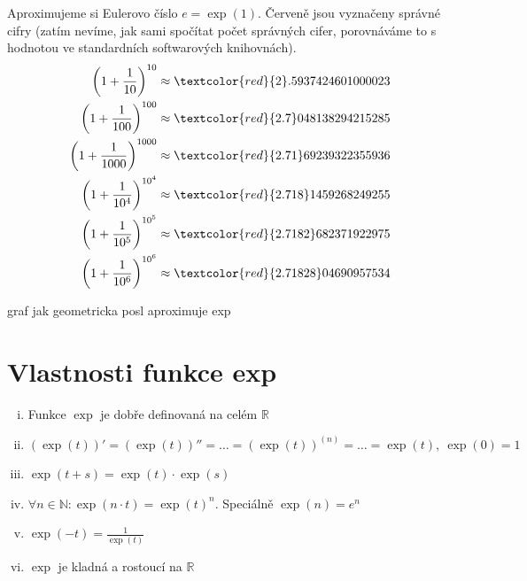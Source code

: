 \begin{příklad}
  Aproximujeme si Eulerovo číslo $e=\exp(1).$ Červeně jsou vyznačeny správné cifry (zatím nevíme, jak sami spočítat počet správných cifer, porovnáváme to s hodnotou ve standardních softwarových knihovnách).
  \begin{align*}
	  \left(1+\frac{1}{10}\right)^{10}&\approx \textcolor{red}{2}.5937424601000023 \\
	  \left(1+\frac{1}{100}\right)^{100}&\approx \textcolor{red}{2.7}048138294215285 \\
	  \left(1+\frac{1}{1000}\right)^{1000}&\approx \textcolor{red}{2.71}69239322355936 \\
	  \left(1+\frac{1}{10^{4}}\right)^{10^{4}}&\approx \textcolor{red}{2.718}1459268249255 \\
	  \left(1+\frac{1}{10^{5}}\right)^{10^{5}}&\approx \textcolor{red}{2.7182}682371922975 \\
	  \left(1+\frac{1}{10^{6}}\right)^{10^{6}}&\approx \textcolor{red}{2.71828}04690957534
  \end{align*}
\end{příklad}

\begin{Todo}
  graf jak geometricka posl aproximuje exp
\end{Todo}

\section{Vlastnosti funkce exp}\label{sec:zavedeni funkce exp}


\begin{věta}\label{veta:vlastnosti exp}\leavevmode
\begin{enumerate}[(i)]
	\item Funkce $\exp$ je dobře definovaná na celém $\mathbb{R}$
	\item $(\exp(t))'=(\exp(t))''=\hdots=(\exp(t))^{(n)}=\hdots=\exp(t),\ \exp(0)=1$
	\item $\exp(t+s)=\exp(t)\cdot \exp(s)$
\item $\forall n\in \mathbb{N}\colon \exp(n\cdot t)=\exp(t)^{n}.$ Speciálně $\exp(n)=e^{n}$
	\item $\exp(-t)=\frac{1}{\exp(t)}$
	\item $\exp$ je kladná a rostoucí na $\mathbb{R}$
\end{enumerate}
\end{věta}

